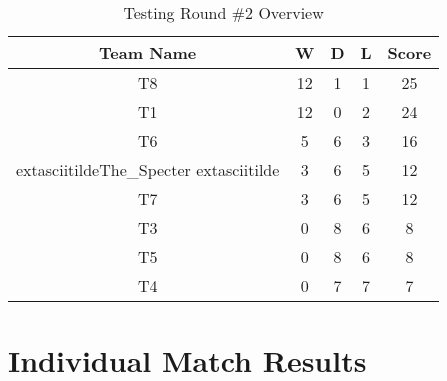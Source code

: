 \documentclass[a4paper,12pt]{article}
\begin{document}
\begin{table}[H]
  \centering
  \caption{Testing Round \#2 Overview}
  \begin{tabular}{|c|c|c|c|c|}
    \hline
      \textbf{Team Name} & \textbf{W} & \textbf{D} & \textbf{L} & \textbf{Score} \\
      \hline
      \hline
       
        
            T8 & 12 & 1 & 1 & 25 \\
            \hline  
            
               
        
            T1 & 12 & 0 & 2 & 24 \\
            \hline  
            
               
        
            T6 & 5 & 6 & 3 & 16 \\
            \hline  
            
               
         
          	extasciitildeThe\_Specter	extasciitilde & 3 & 6 & 5 & 12 \\
          \hline  
          
               
        
            T7 & 3 & 6 & 5 & 12 \\
            \hline  
            
               
        
            T3 & 0 & 8 & 6 & 8 \\
            \hline  
            
               
        
            T5 & 0 & 8 & 6 & 8 \\
            \hline  
            
               
        
            T4 & 0 & 7 & 7 & 7 \\
            \hline  
            
              
                
              \end{tabular}
              \label{table:overview}
          \end{table}

          \section{Individual Match Results}
          \label{sec:all}
\end{document}
